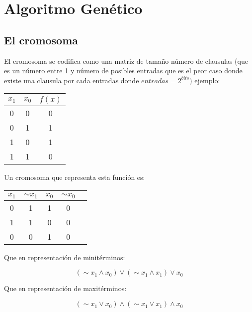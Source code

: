 \documentclass[letter]{article}
\begin{document}
\section{Algoritmo Genético}

\subsection{El cromosoma}

El cromosoma se codifica como una matriz de tamaño número de clausulas (que es un número entre 1 y número de posibles entradas que es el peor caso donde existe una clausula por cada entradas donde $entradas=2^{bits})$ ejemplo:

\begin{table}[H]
	\centering
	\begin{tabular}{|c | c | c|}
		\hline
		$x_1$ & $x_0$ & $f(x)$ \\
		\hline
		0 & 0& 0\\
		\hline
		0 & 1 & 1\\
		\hline
		1 & 0& 1\\
		\hline
		1 & 1 & 0\\
		\hline
	\end{tabular}
\end{table}

Un cromosoma que representa esta función es:

\begin{table}[H]
	\centering
	\begin{tabular}{|c | c | c|  c|  c|}
		\hline
		$x_1$ & $ \sim{x_1}$ & $x_0$ & $ \sim{x_0}$\\
		\hline
		0 & 1& 1 & 0\\
		\hline
		1 & 1& 0 & 0\\
		\hline
		0 & 0& 1 & 0\\
		\hline
	\end{tabular}
\end{table}

Que en representación de minitérminos:

\begin{equation}
	(\sim{x_1} \wedge x_0) \vee (\sim{x_1} \wedge x_1) \vee x_0
\end{equation}

Que en representación de maxitérminos:

\begin{equation}
	(\sim{x_1} \vee x_0) \wedge (\sim{x_1} \vee x_1) \wedge x_0
\end{equation}
\end{document}
